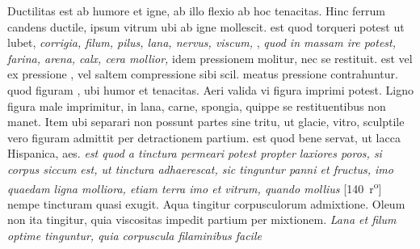Ductilitas\protect{} est ab humore et igne, ab illo flexio ab hoc tenacitas. Hinc ferrum candens ductile, ipsum vitrum ubi ab igne mollescit.  est quod torqueri potest ut lubet, \textit{corrigia, filum\protect{}, pilus, lana\protect{}, nervus, viscum\protect{}, } , \textit{quod in massam ire potest, farina, arena\protect{}, calx\protect{}, cera mollior, } idem pressionem molitur, nec se restituit.
\pend
\pstart {}
 est vel ex pressione , vel saltem compressione  sibi scil. meatus pressione contrahuntur.  quod figuram , ubi humor et tenacitas. Aeri valida vi figura imprimi potest. Ligno figura male imprimitur, in lana, carne, spongia\protect{}, quippe se restituentibus non manet. Item ubi separari non possunt partes sine tritu\protect{}, ut glacie, vitro, sculptile vero figuram admittit per detractionem partium.
 est quod  bene servat, ut lacca Hispanica, aes.  \textit{est quod a tinctura\protect{} permeari potest propter laxiores poros, si corpus siccum est, ut tinctura adhaerescat, sic tinguntur panni\protect{} et fructus, imo quaedam ligna molliora, etiam terra imo et vitrum, quando mollius }
%
% 
[140~r\textsuperscript{o}]
%
nempe tincturam quasi exugit. Aqua tingitur corpusculorum admixtione. Oleum non ita tingitur, quia viscositas\protect{} impedit partium per mixtionem. \textit{Lana et filum optime tinguntur, quia corpuscula filaminibus facile }

